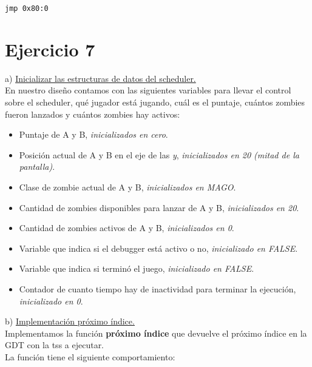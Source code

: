 \documentclass[a4paper]{article}
\begin{document}
\begin{codesnippet}
\begin{verbatim}
jmp 0x80:0
\end{verbatim}
\end{codesnippet}



\newpage
\section{Ejercicio 7}


{\large a)} \underline{Inicializar las estructuras de datos del scheduler.}\\

En nuestro dise\~no contamos con las siguientes variables para llevar el control sobre el scheduler, qu\'e jugador est\'a jugando, cu\'al es el puntaje, cu\'antos zombies fueron lanzados y cu\'antos zombies hay activos:

\begin{itemize}
\item Puntaje de A y B, \textit{inicializados en cero}.
\item Posici\'on actual de A y B en el eje de las \emph{y}, \textit{inicializados en 20 (mitad de la pantalla)}.
\item Clase de zombie actual de A y B, \textit{inicializados en MAGO}.
\item Cantidad de zombies disponibles para lanzar de A y B, \textit{inicializados en 20}.
\item Cantidad de zombies activos de A y B, \textit{inicializados en 0}.
\item Variable que indica si el debugger est\'a activo o no, \textit{inicializado en FALSE}.
\item Variable que indica si termin\'o el juego, \textit{inicializado en FALSE}.
\item Contador de cuanto tiempo hay de inactividad para terminar la ejecuci\'on, \textit{inicializado en 0}.
\end{itemize}



\bigskip

{\large b)} \underline{Implementaci\'on pr\'oximo \'indice.}\\

Implementamos la funci\'on \textbf{pr\'oximo \'indice} que devuelve el pr\'oximo \'indice en la GDT con la tss a ejecutar.\\

La funci\'on tiene el siguiente comportamiento:
\end{document}

